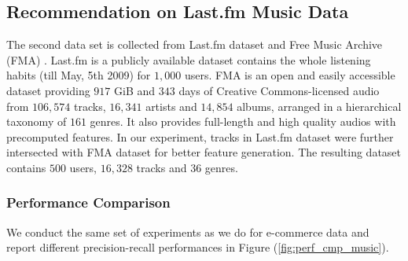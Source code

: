 \subsection{Recommendation on Last.fm Music Data}
The second data set is collected from Last.fm dataset \cite{Celma:Springer2010} and Free Music Archive (FMA) \cite{FMA}. Last.fm is a publicly available dataset contains the whole listening habits (till May, 5th 2009) for $1,000$ users. FMA is an open and easily accessible dataset providing $917$ GiB and $343$ days of Creative Commons-licensed audio from $106,574$ tracks, $16,341$ artists and $14,854$ albums, arranged in a hierarchical taxonomy of $161$ genres. It also provides full-length and high quality audios with precomputed features.  In our experiment, tracks in Last.fm dataset were further intersected with FMA dataset for better feature generation.  The resulting dataset contains $500$ users, $16,328$ tracks and $36$ genres.

\subsubsection{Performance Comparison}
We conduct the same set of experiments as we do for e-commerce data and report different precision-recall performances in Figure (\ref{fig:perf_cmp_music}).  




